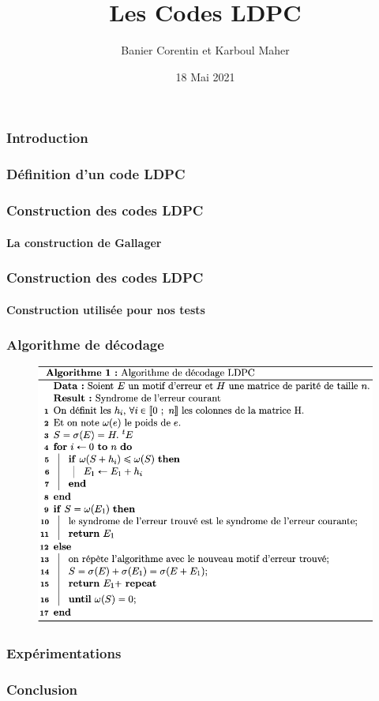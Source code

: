 \documentclass{beamer}
\title{Les Codes LDPC}
\author{Banier Corentin et Karboul Maher}
\institute{Université de Bordeaux}
\date{18 Mai 2021}
\begin{document}
	\begin{frame}
    \titlepage
	\end{frame}

    \begin{frame}
        \frametitle{Introduction}
    \end{frame}

    \begin{frame}
        \frametitle{Définition d'un code LDPC}
    \end{frame}

    \begin{frame}
        \frametitle{Construction des codes LDPC}
        \framesubtitle{La construction de Gallager}
    \end{frame}
    
    \begin{frame}
        \frametitle{Construction des codes LDPC}
        \framesubtitle{Construction utilisée pour nos tests}
    \end{frame}

    \begin{frame}
        \frametitle{Algorithme de décodage}
        \begin{figure}[!h]
            \centering
            \includegraphics[scale=0.65]{algo.png}  
            \label{fig:algo}
        \end{figure}
    \end{frame}

    \begin{frame}
        \frametitle{Expérimentations}
    \end{frame}

    \begin{frame}
        \frametitle{Conclusion}
    \end{frame}
\end{document}
